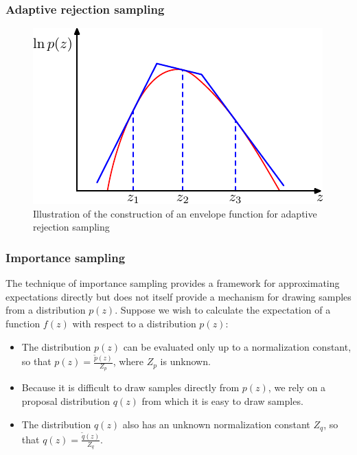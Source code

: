 \documentclass{beamer}
\begin{document}
\begin{frame}
    \frametitle{Adaptive rejection sampling}
    \begin{figure}
        \caption{Illustration of the construction of an envelope function for adaptive rejection sampling}
        \includegraphics{Figure_6.pdf}
    \end{figure}
\end{frame}

\begin{frame}
    \frametitle{Importance sampling}
    The technique of importance sampling provides a framework for approximating expectations directly but does not itself provide a mechanism for drawing samples from a distribution $p(z)$.
    \bigbreak
    Suppose we wish to calculate the expectation of a function $f(z)$ with respect to a distribution $p(z)$:
    \begin{itemize}
        \item The distribution $p(z)$ can be evaluated only up to a normalization constant, so that $p(z)=\frac{\tilde{p}(z)}{Z_{p}}$, where $Z_{p}$ is unknown.
        \item Because it is difficult to draw samples directly from $p(z)$, we rely on a proposal distribution $q(z)$ from which it is easy to draw samples.
        \item The distribution $q(z)$ also has an unknown normalization constant $Z_{q}$, so that $q(z)=\frac{\tilde{q}(z)}{Z_{q}}$.
    \end{itemize}
\end{frame}
\end{document}
